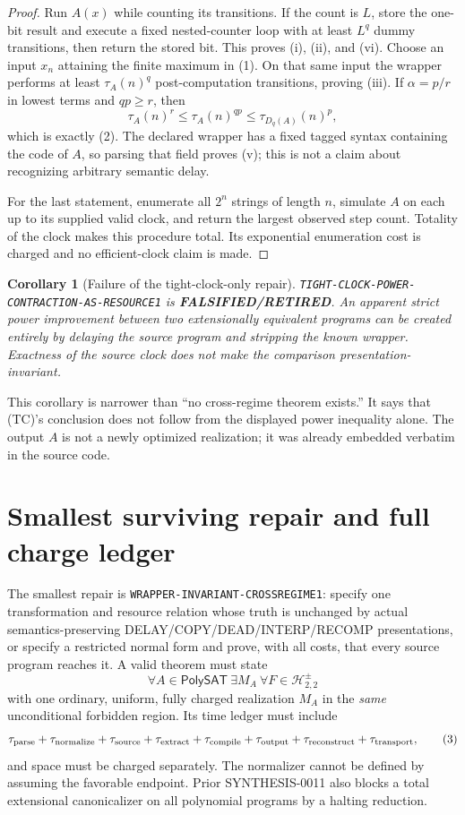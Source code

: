 \documentclass[11pt]{article}
\newtheorem{corollary}{Corollary}
\newcommand{\PolySAT}{\mathsf{PolySAT}}
\newcommand{\Hsigned}{\mathcal H^{\pm}_{2,2}}
\newcommand{\RETIRED}{\textbf{FALSIFIED/RETIRED}}
\begin{document}
\begin{proof}
Run $A(x)$ while counting its transitions.  If the count is $L$, store the
one-bit result and execute a fixed nested-counter loop with at least $L^q$
dummy transitions, then return the stored bit.  This proves (i), (ii), and
(vi).  Choose an input $x_n$ attaining the finite maximum in (1).  On that
same input the wrapper performs at least $\tau_A(n)^q$ post-computation
transitions, proving (iii).  If $\alpha=p/r$ in lowest terms and
$q p\ge r$, then
\[
 \tau_A(n)^r\le \tau_A(n)^{qp}
              \le \tau_{D_q(A)}(n)^p,
\]
which is exactly (2).  The declared wrapper has a fixed tagged syntax
containing the code of $A$, so parsing that field proves (v); this is not a
claim about recognizing arbitrary semantic delay.

For the last statement, enumerate all $2^n$ strings of length $n$, simulate
$A$ on each up to its supplied valid clock, and return the largest observed
step count.  Totality of the clock makes this procedure total.  Its exponential
enumeration cost is charged and no efficient-clock claim is made.
\end{proof}

\begin{corollary}[Failure of the tight-clock-only repair]
\texttt{TIGHT-CLOCK-POWER-CONTRACTION-AS-RESOURCE1} is \RETIRED.  An apparent
strict power improvement between two extensionally equivalent programs can
be created entirely by delaying the source program and stripping the known
wrapper.  Exactness of the source clock does not make the comparison
presentation-invariant.
\end{corollary}

This corollary is narrower than ``no cross-regime theorem exists.''  It says
that (TC)'s conclusion does not follow from the displayed power inequality
alone.  The output $A$ is not a newly optimized realization; it was already
embedded verbatim in the source code.

\section{Smallest surviving repair and full charge ledger}

The smallest repair is \texttt{WRAPPER-INVARIANT-CROSSREGIME1}:
specify one transformation and resource relation whose truth is unchanged by
actual semantics-preserving DELAY/COPY/DEAD/INTERP/RECOMP presentations, or
specify a restricted normal form and prove, with all costs, that every source
program reaches it.  A valid theorem must state
\[
 \forall A\in\PolySAT\ \exists M_A\ \forall F\in\Hsigned
\]
with one ordinary, uniform, fully charged realization $M_A$ in the \emph{same}
unconditional forbidden region.  Its time ledger must include
\[
 \tau_{\rm parse}+\tau_{\rm normalize}+\tau_{\rm source}
 +\tau_{\rm extract}+\tau_{\rm compile}+\tau_{\rm output}
 +\tau_{\rm reconstruct}+\tau_{\rm transport},                \tag{3}
\]
and space must be charged separately.  The normalizer cannot be defined by
assuming the favorable endpoint.  Prior SYNTHESIS-0011 also blocks a total
extensional canonicalizer on all polynomial programs by a halting reduction.
\end{document}
